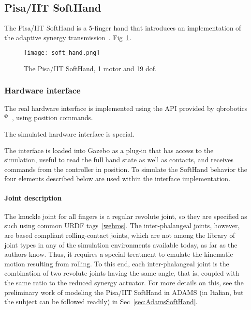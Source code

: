 \subsection{Pisa/IIT SoftHand}
\label{sec:softhand}

The Pisa/IIT SoftHand is a 5-finger hand that introduces an implementation of the adaptive synergy transmission~\cite{Catalano2014Adaptive}. Fig~\ref{fig:soft_hand}.

\begin{figure}[b]
\centering
\texttt{[image: soft\_hand.png]}
\caption{The Pisa/IIT SoftHand, 1 motor and 19 dof.}
\label{fig:soft_hand}
\end{figure}

\subsubsection{Hardware interface}

The real hardware interface is implemented using the API provided by qbrobotics$^{\copyright}$~\cite{qbrobotics_software}, using position commands. 

The simulated hardware interface is special. 

The interface is loaded into Gazebo as a plug-in that has access to the simulation, useful to read the full hand state as well as contacts, and receives commands from the controller in position. To simulate the SoftHand behavior the four elements described below are used within the interface implementation.

\paragraph{Joint description} The knuckle joint for all fingers is a regular revolute joint, so they are specified as such using common URDF tags~\ref{webros}. The inter-phalangeal joints, however, are based compliant rolling-contact joints, which are not among the library of joint types in any of the simulation environments available today, as far as the authors know. Thus, it requires a special treatment to emulate the kinematic motion resulting from rolling. To this end, each inter-phalangeal joint is the combination of two revolute joints having the same angle, that is, coupled with the same ratio to the reduced synergy actuator. For more details on this, see the preliminary work of modeling the Pisa/IIT SoftHand in ADAMS (in Italian, but the subject can be followed readily) in Sec~\ref{sec:AdamsSoftHand}.

